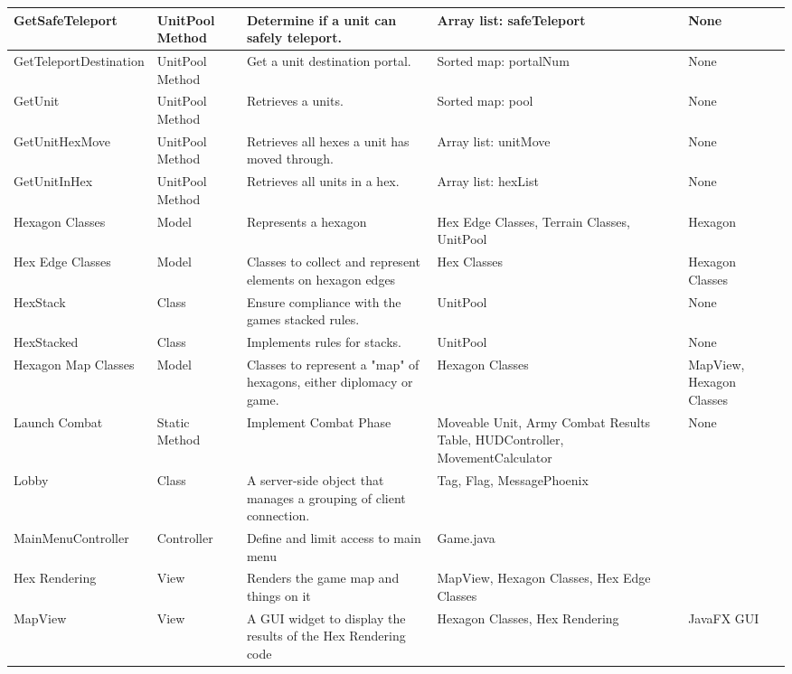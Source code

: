 \documentclass[12pt,a4paper,titlepage]{article}
\begin{document}
{\begin{center}
\begin{tabularx}{\linewidth}{|p{1.5in}|X|X|X|X|}
\hline
GetSafeTeleport & UnitPool Method & Determine if a unit can safely teleport. & Array list: safeTeleport & None\\
\hline
GetTeleportDestination & UnitPool Method & Get a unit destination portal. & Sorted map: portalNum & None\\
\hline
GetUnit & UnitPool Method & Retrieves a  units. & Sorted map: pool & None\\
\hline
GetUnitHexMove & UnitPool Method & Retrieves all hexes a unit has moved through. & Array list: unitMove & None\\
\hline
GetUnitInHex & UnitPool Method & Retrieves all units in a hex. & Array list: hexList & None\\
\hline

Hexagon Classes & Model & Represents a hexagon & Hex Edge Classes, Terrain Classes, UnitPool & Hexagon \\
\hline
Hex Edge Classes & Model & Classes to collect and represent elements on hexagon edges & Hex Classes & Hexagon Classes \\
\hline
HexStack & Class & Ensure compliance with the games stacked rules. & UnitPool & None\\
\hline
HexStacked & Class & Implements rules for stacks. & UnitPool & None\\
\hline
Hexagon Map Classes & Model & Classes to represent a "map" of hexagons, either diplomacy or game. & Hexagon Classes &
MapView, Hexagon Classes \\
\hline
Launch Combat & Static Method & Implement Combat Phase & Moveable Unit, Army Combat Results Table, HUDController, MovementCalculator & None\\
\hline
Lobby & Class & A server-side object that manages a grouping of client connection. & Tag, Flag, MessagePhoenix & \\ 
\hline
MainMenuController & Controller & Define and limit access to main menu & Game.java & \\
\hline
Hex Rendering & View & Renders the game map and things on it & MapView, Hexagon Classes, Hex Edge Classes & \\
\hline
MapView & View & A GUI widget to display the results of the Hex Rendering code & Hexagon Classes, Hex Rendering &
JavaFX GUI \\


\end{tabularx}
\end{center}}
\end{document}
